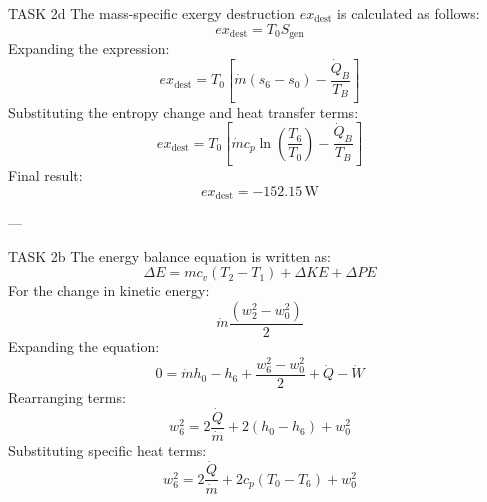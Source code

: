 TASK 2d  
The mass-specific exergy destruction \( ex_{\text{dest}} \) is calculated as follows:  
\[
ex_{\text{dest}} = T_0 S_{\text{gen}}
\]  
Expanding the expression:  
\[
ex_{\text{dest}} = T_0 \left[ \dot{m} (s_6 - s_0) - \frac{\dot{Q}_B}{T_B} \right]
\]  
Substituting the entropy change and heat transfer terms:  
\[
ex_{\text{dest}} = T_0 \left[ \dot{m} c_p \ln \left( \frac{T_6}{T_0} \right) - \frac{\dot{Q}_B}{T_B} \right]
\]  
Final result:  
\[
ex_{\text{dest}} = -152.15 \, \text{W}
\]  

---

TASK 2b  
The energy balance equation is written as:  
\[
\Delta E = m c_v (T_2 - T_1) + \Delta KE + \Delta PE
\]  
For the change in kinetic energy:  
\[
\dot{m} \frac{(w_2^2 - w_0^2)}{2}
\]  
Expanding the equation:  
\[
0 = \dot{m} h_0 - h_6 + \frac{w_6^2 - w_0^2}{2} + \dot{Q} - \dot{W}
\]  
Rearranging terms:  
\[
w_6^2 = 2 \frac{\dot{Q}}{\dot{m}} + 2 (h_0 - h_6) + w_0^2
\]  
Substituting specific heat terms:  
\[
w_6^2 = 2 \frac{\dot{Q}}{\dot{m}} + 2 c_p (T_0 - T_6) + w_0^2
\]